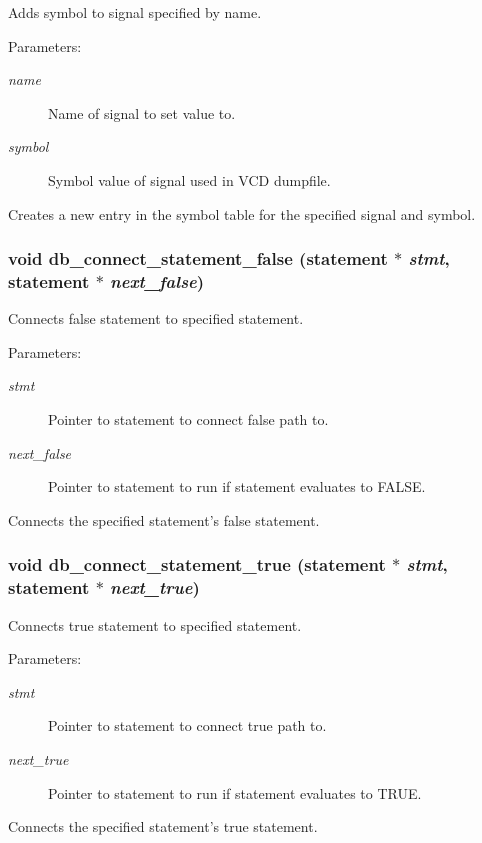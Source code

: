 Adds symbol to signal specified by name.

\begin{Desc}
\item[Parameters: ]\par
\begin{description}
\item[{\em 
name}]Name of signal to set value to. \item[{\em 
symbol}]Symbol value of signal used in VCD dumpfile.\end{description}
\end{Desc}
Creates a new entry in the symbol table for the specified signal and symbol. 
\subsubsection{\setlength{\rightskip}{0pt plus 5cm}void db\_\-connect\_\-statement\_\-false ({\bf statement} $\ast$ {\em stmt}, {\bf statement} $\ast$ {\em next\_\-false})}\label{db_8h_a15}


Connects false statement to specified statement.

\begin{Desc}
\item[Parameters: ]\par
\begin{description}
\item[{\em 
stmt}]Pointer to statement to connect false path to. \item[{\em 
next\_\-false}]Pointer to statement to run if statement evaluates to FALSE.\end{description}
\end{Desc}
Connects the specified statement's false statement. 
\subsubsection{\setlength{\rightskip}{0pt plus 5cm}void db\_\-connect\_\-statement\_\-true ({\bf statement} $\ast$ {\em stmt}, {\bf statement} $\ast$ {\em next\_\-true})}\label{db_8h_a14}


Connects true statement to specified statement.

\begin{Desc}
\item[Parameters: ]\par
\begin{description}
\item[{\em 
stmt}]Pointer to statement to connect true path to. \item[{\em 
next\_\-true}]Pointer to statement to run if statement evaluates to TRUE.\end{description}
\end{Desc}
Connects the specified statement's true statement. 
